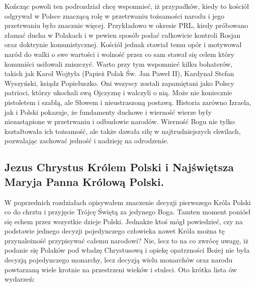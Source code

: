 Kończąc powoli ten podrozdział chcę wspomnieć, iż przypadków, kiedy to kościół
odgrywał w Polsce znaczącą rolę w przetrwaniu tożsamości narodu i jego przetrwaniu było
znacznie więcej. Przykładowo w okresie PRL, kiedy próbowano złamać ducha w Polakach i
w pewien sposób podać całkowicie kontroli Rosjan oraz doktrynie komunistycznej. Kościół
jednak stawiał temu opór i motywował naród do walki o swe wartości i wolność przez co
sam stawał się celem który komuniści usiłowali zniszczyć. Warto przy tym wspomnieć
kilku bohaterów, takich jak Karol Wojtyła (Papież Polak Św. Jan Paweł II), Kardynał Stefan
Wyszyński, ksiądz Popiełuszko. Oni wszyscy zostali zapamiętani jako Polscy patrioci,
którzy ukochali swą Ojczyznę i walczyli o nią. Może nie koniecznie pistoletem i szablą, ale
Słowem i nieustraszoną postawą. Historia zarówno Izraela, jak i Polski pokazuje, że
fundamenty duchowe i wierność wierze były niezastąpione w przetrwaniu i odbudowie
narodów. Wierność Bogu nie tylko kształtowała ich tożsamość, ale także dawała siłę w
najtrudniejszych chwilach, pozwalając zachować jedność i nadzieję na odrodzenie.

\subsection{Jezus Chrystus Królem Polski i Najświętsza Maryja Panna Królową
Polski.}

W poprzednich rozdziałach opisywałem znaczenie decyzji pierwszego Króla Polski
co do chrztu i przyjęcie Trójcę Świętą za jedynego Boga. Tamten moment poniósł się
echem przez wszystkie dzieje Polski. Jednakże ktoś mógł powiedzieć, czy na podstawie
jednego decyzji pojedynczego człowieka nawet Króla można tę przynależność przypisywać
całemu narodowi? Nie, lecz to na co zwrócę uwagę, iż podanie się Polaków pod władzę
Chrystusową i opiekę opatrzności Bożej nie była decyzją pojedynczego monarchy, lecz
decyzją wielu monarchów oraz narodu powtarzaną wiele krotnie na przestrzeni wieków i
stuleci. Oto krótka lista ów wydarzeń:

